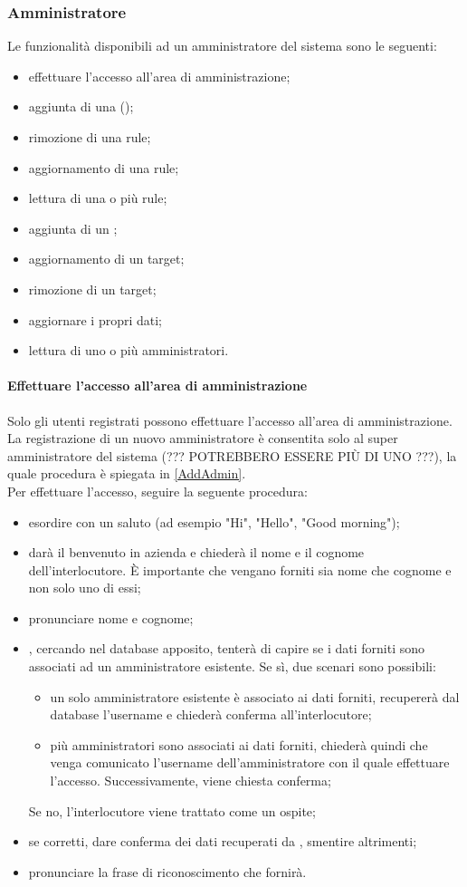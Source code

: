\subsubsection{Amministratore}
Le funzionalità disponibili ad un amministratore del sistema sono le seguenti:
\begin{itemize}
	\item effettuare l'accesso all'area di amministrazione;
	\item aggiunta di una  ();
	\item rimozione di una rule;
	\item aggiornamento di una rule;
	\item lettura di una o più rule;
	\item aggiunta di un ;
	\item aggiornamento di un target;
	\item rimozione di un target;
	\item aggiornare i propri dati;
	\item lettura di uno o più amministratori.
\end{itemize}
\paragraph{Effettuare l'accesso all'area di amministrazione}\label{adminArea}
Solo gli utenti registrati possono effettuare l'accesso all'area di amministrazione. La registrazione di un nuovo amministratore è consentita solo al super amministratore del sistema (??? POTREBBERO ESSERE PIÙ DI UNO ???), la quale procedura è spiegata in \ref{AddAdmin}. \\
Per effettuare l'accesso, seguire la seguente procedura:
\begin{itemize}
	\item esordire con un saluto (ad esempio "Hi", "Hello", "Good morning");
	\item \PROGETTO{} darà il benvenuto in azienda e chiederà il nome e il cognome dell'interlocutore. È importante che vengano forniti sia nome che cognome e non solo uno di essi;
	\item pronunciare nome e cognome;
	\item \PROGETTO, cercando nel database apposito, tenterà di capire se i dati forniti sono associati ad un amministratore esistente. Se sì, due scenari sono possibili:
	\begin{itemize}
		\item un solo amministratore esistente è associato ai dati forniti, \PROGETTO{} recupererà dal database l'username e chiederà conferma all'interlocutore;
		\item più amministratori sono associati ai dati forniti, \PROGETTO{} chiederà quindi che venga comunicato l'username dell'amministratore con il quale effettuare l'accesso. Successivamente, viene chiesta conferma; 
	\end{itemize}
	Se no, l'interlocutore viene trattato come un ospite;
	\item se corretti, dare conferma dei dati recuperati da \PROGETTO, smentire altrimenti;
	\item pronunciare la frase di riconoscimento che \PROGETTO{} fornirà.
\end{itemize}
